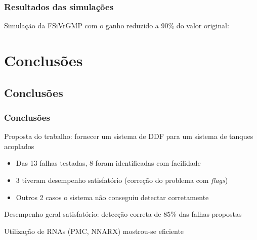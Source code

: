 \documentclass{beamer}
\begin{document}
\begin{frame}
    \frametitle{Resultados das simulações}

\footnotesize Simulação da FSiVrGMP com o ganho reduzido a 90\% do valor
original:

\begin{figure}[htb] 
\footnotesize 
\centering 
\scalebox{0.68}{}
\end{figure}
    
\end{frame}

\section{Conclusões}
\subsection*{Conclusões}
\begin{frame}
    \frametitle{Conclusões}

    Proposta do trabalho: fornecer um sistema de DDF para um sistema de tanques
    acoplados

\begin{itemize}
    \item Das 13 falhas testadas, 8 foram identificadas com facilidade
    \item 3 tiveram desempenho satisfatório (correção do problema com {\it
          flags})
    \item Outros 2 casos o sistema não conseguiu detectar corretamente 
\end{itemize}

    Desempenho geral satisfatório: detecção correta de 85\% das falhas propostas

    \vspace{0.25cm}

    Utilização de RNAs (PMC, NNARX) mostrou-se eficiente

\end{frame}

\end{document}
